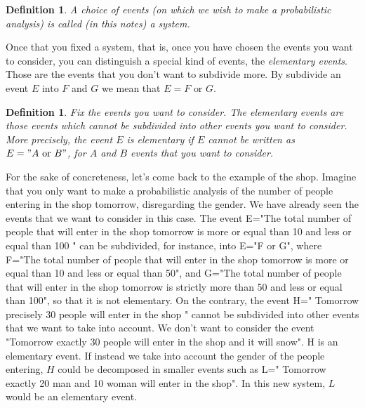 \documentclass[12pt]{article}
\newtheorem{definition}[theorem]{Definition}
\newcommand{\<}{{\langle \!\! \langle}}
\renewcommand{\>}{{\rangle \!\! \rangle}}
\begin{document}
\begin{definition}
	A choice of events (on which we wish to make a probabilistic analysis) is called (in this notes) a system. 
\end{definition}

 Once that you fixed a system, that is, once you have chosen the events you want to consider, you can distinguish a special kind of events, the \emph{elementary events}. Those are the events that you don't want to subdivide more. By subdivide an event $E$ into $F$ and $G$ we mean that $E= F \textrm{ or } G$.\\  

\begin{definition}
	Fix the events you want to consider. The elementary events are those events  which cannot be subdivided into other events you want to consider. More precisely, the event $E$ is elementary if $E$ cannot be written as $E= "A\textrm{ or } B"$, for $A$ and $B$ events that you want to consider.  
\end{definition}



For the sake of concreteness, let's come back to the example of the shop. Imagine that you only want to make a probabilistic analysis of  the number of people entering in the shop tomorrow, disregarding the gender. We have already seen the events that we want to consider in this case. The event E="The total number of people that will enter in the shop tomorrow is more or equal than 10 and less or equal than 100 " can be subdivided, for instance, into E="F or G", where 
F="The total number of people that will enter in the shop tomorrow is more or equal than 10 and less or equal than 50", and 
G="The total number of people that will enter in the shop tomorrow is strictly more than 50 and less or equal than 100", so that it is not elementary. On the contrary, the event H=" Tomorrow precisely 30 people will enter in the shop " cannot be subdivided into other events that we want to take into account. We don't want to consider the event "Tomorrow exactly 30 people will enter in the shop and it will snow". H is an elementary event. 
If instead we take into account the gender of the people entering, $H$ could be decomposed in smaller events such as L=" Tomorrow exactly 20 man and 10 woman will enter in the shop". In this new system, $L$ would be an elementary event. \\ 
\end{document}
